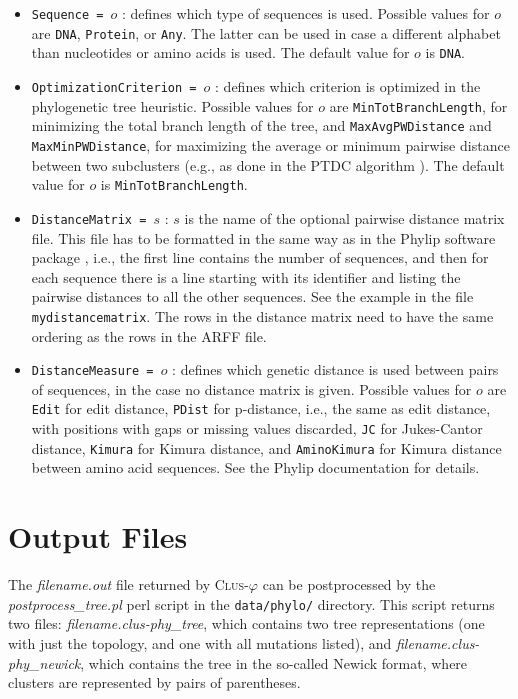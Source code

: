 \documentclass[a4paper]{report}
\newcommand{\clusphy}{\textsc{Clus}-$\varphi$}
\begin{document}
\begin{itemize}
\item {\tt Sequence = $o$} : defines which type of sequences is used. Possible values for $o$ are {\tt DNA}, {\tt Protein}, or {\tt Any}. The latter can be used in case a different alphabet than nucleotides or amino acids is used. The default value for $o$ is {\tt DNA}.
\item {\tt OptimizationCriterion = $o$} : defines which criterion is optimized in the phylogenetic tree heuristic. Possible values for $o$ are {\tt MinTotBranchLength}, for minimizing the total branch length of the tree, and {\tt MaxAvgPWDistance} and {\tt MaxMinPWDistance}, for maximizing the average or minimum pairwise distance between two subclusters (e.g., as done in the PTDC algorithm \cite{Arslan07:proc}). The default value for $o$ is {\tt MinTotBranchLength}.
\item {\tt DistanceMatrix = $s$} : $s$ is the name of the optional pairwise distance matrix file. This file has to be formatted in the same way as in the Phylip software package \cite{Phylip3.6-08:misc}, i.e., the first line contains the number of sequences, and then for each sequence there is a line starting with its identifier and listing the pairwise distances to all the other sequences. See the example in the file \texttt{mydistancematrix}. The rows in the distance matrix need to have the same ordering as the rows in the ARFF file.
\item {\tt DistanceMeasure = $o$} : defines which genetic distance is used between pairs of sequences, in the case no distance matrix is given. Possible values for $o$ are {\tt Edit} for edit distance, {\tt PDist} for p-distance, i.e., the same as edit distance, with positions with gaps or missing values discarded, {\tt JC} for Jukes-Cantor distance, {\tt Kimura} for Kimura distance, and {\tt AminoKimura} for Kimura distance between amino acid sequences. See the Phylip documentation \cite{Phylip3.6-08:misc} for details.
\end{itemize}

\section{Output Files}
The \emph{filename.out} file returned by \clusphy{} can be postprocessed by the \emph{postprocess\_tree.pl} perl script in the {\tt data/phylo/} directory. This script returns two files: \emph{filename.clus-phy\_tree}, which contains two tree representations (one with just the topology, and one with all mutations listed), and \emph{filename.clus-phy\_newick}, which contains the tree in the so-called Newick format, where clusters are represented by pairs of parentheses.




\end{document}
